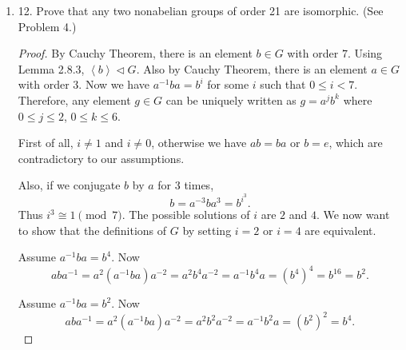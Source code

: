 \begin{enumerate}
\begin{proof}
	 Now $\left| G / \left\langle a \right\rangle  \right|  = 6$. By Lemma 2.8.3, a group of order $6$ has a normal subgroup of order $3$. Call this subgroup $N'$.

	 Define the homomorphism
	 \begin{align*}
	 	\varphi: G &\longrightarrow G / \left\langle a \right\rangle  \\
	 	g &\longmapsto \varphi(g) = \left\langle a \right\rangle g
	 .\end{align*}
	 We have verified that $\varphi$ is a surjective homomorphism when we were studying homomorphism theorems. Let $K = \left\langle a \right\rangle $ be the kernel of $\varphi$.

	 By the Correspondence Theorem, $N := \varphi^{-1}(N')$ is a normal subgroup of $G$, $K \subset N$, and $N / K \cong N'$. Thus
	 \[
	 	\left| \left( G / \left\langle a \right\rangle \right)  / \left( N / \left\langle a \right\rangle \right)  \right|  = 6 / 3 = 2
	 .\] 
	 By Third Homomorphism theorem,
	 \[
	 	G / N \cong (G / K) / (N / K)
	 .\] 
	 So $|G / N| = 2$. Thus $|N| = |G| / 2 = 21$.

	 

	
\end{proof}
\item 12. Prove that any two nonabelian groups of order 21 are isomorphic. (See Problem 4.)
\begin{proof}
	 By Cauchy Theorem, there is an element $b \in G$ with order $7$. Using Lemma 2.8.3, $\left\langle b \right\rangle \triangleleft G$. Also by Cauchy Theorem, there is an element $a \in G$ with order $3$. Now we have $a^{-1} b a = b^i$ for some $i$ such that $0\le i < 7$. Therefore, any element $g \in G$ can be uniquely written as $g = a^j b^k$ where $0\le j\le 2$, $0\le k\le 6$.

	 First of all, $i\neq 1$ and $i \neq 0$, otherwise we have  $ab = ba$ or $b = e$, which are contradictory to our assumptions. 

	 Also, if we conjugate $b$ by $a$ for $3$ times,
	 \[
	 	b = a^{-3} ba^{3} = b^{i^3}
	 .\] 
	 Thus $i^3 \cong 1 \pmod 7$. The possible solutions of $i$ are $2$ and $4$. We now want to show that the definitions of $G$ by setting $i = 2$ or $i = 4$ are equivalent.

	Assume $a^{-1} ba = b^4$. Now \[
		aba^{-1} = a^2 (a^{-1} ba)a^{-2} = a^2 b^4 a^{-2} = a^{-1} b^4 a = (b^{4})^{4} = b^{16} = b^2
	.\] 

	Assume $a^{-1}ba = b^2$. Now
\[
		aba^{-1} = a^2 (a^{-1} ba)a^{-2} = a^2 b^2 a^{-2} = a^{-1} b^2 a = (b^{2})^{2} = b^{4} 
	.\]


\end{proof}
\end{enumerate}
